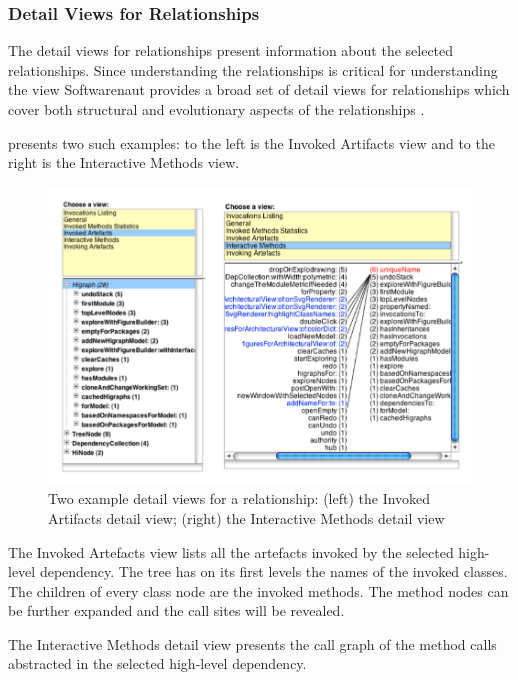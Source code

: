 \documentclass[preprint,12pt]{elsarticle}
\begin{document}
\subsubsection {Detail Views for Relationships}
The detail views for relationships present information about the selected relationships. Since understanding the relationships is critical for understanding the view Softwarenaut provides a broad set of detail views for relationships which cover both structural and evolutionary aspects of the relationships \cite{lungu-cutedge, lungu-relevo}. 

 presents two such examples: to the left is the Invoked Artifacts view and to the right is the Interactive Methods view. 

\begin{figure}[h!]
\begin{center}
\includegraphics[width=\linewidth]{DetailsForEdge}
\caption{Two example detail views for a relationship: (left) the Invoked Artifacts detail view; (right) the Interactive Methods detail view}
\end{center}
\end{figure}
The Invoked Artefacts view lists all the artefacts invoked by the selected high-level dependency. The tree has on its first levels the names of the invoked classes. The children of every class node are the invoked methods. The method nodes can be further expanded and the call sites will be revealed. 

The Interactive Methods detail view presents the call graph of the method calls abstracted in the selected high-level dependency. 
\end{document}
